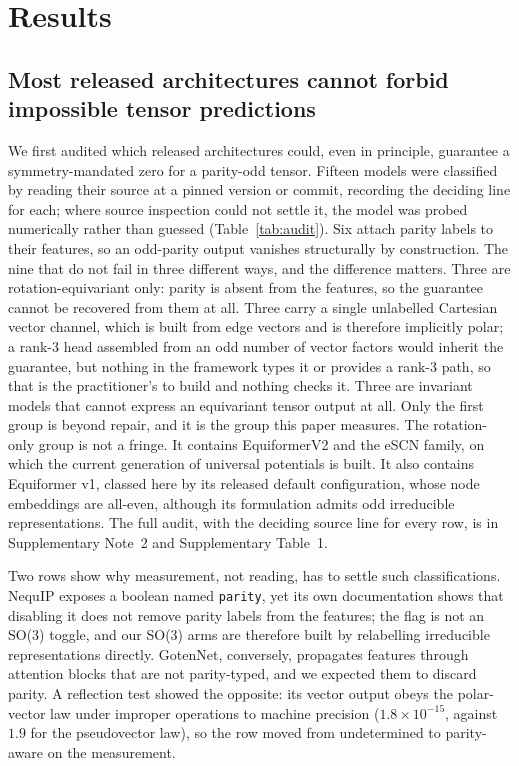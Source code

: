 \section*{Results}

\subsection*{Most released architectures cannot forbid impossible tensor predictions}

We first audited which released architectures could, even in principle, guarantee a symmetry-mandated zero for a parity-odd tensor. Fifteen models were classified by reading their source at a pinned version or commit, recording the deciding line for each; where source inspection could not settle it, the model was probed numerically rather than guessed (Table~\ref{tab:audit}). Six attach parity labels to their features, so an odd-parity output vanishes structurally by construction. The nine that do not fail in three different ways, and the difference matters. Three are rotation-equivariant only: parity is absent from the features, so the guarantee cannot be recovered from them at all. Three carry a single unlabelled Cartesian vector channel, which is built from edge vectors and is therefore implicitly polar; a rank-3 head assembled from an odd number of vector factors would inherit the guarantee, but nothing in the framework types it or provides a rank-3 path, so that is the practitioner's to build and nothing checks it. Three are invariant models that cannot express an equivariant tensor output at all. Only the first group is beyond repair, and it is the group this paper measures. The rotation-only group is not a fringe. It contains EquiformerV2 and the eSCN family, on which the current generation of universal potentials is built\cite{fu2025esen,wood2025uma}. It also contains Equiformer v1, classed here by its released default configuration, whose node embeddings are all-even, although its formulation admits odd irreducible representations. The full audit, with the deciding source line for every row, is in Supplementary Note~2 and Supplementary Table~1.

Two rows show why measurement, not reading, has to settle such classifications. NequIP exposes a boolean named \texttt{parity}, yet its own documentation shows that disabling it does not remove parity labels from the features; the flag is not an SO(3) toggle, and our SO(3) arms are therefore built by relabelling irreducible representations directly. GotenNet, conversely, propagates features through attention blocks that are not parity-typed, and we expected them to discard parity. A reflection test showed the opposite: its vector output obeys the polar-vector law under improper operations to machine precision ($1.8\times10^{-15}$, against $1.9$ for the pseudovector law), so the row moved from undetermined to parity-aware on the measurement.

